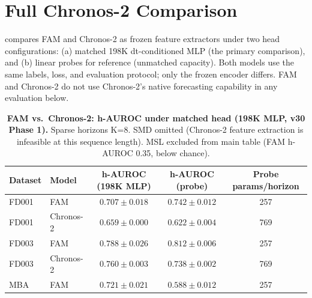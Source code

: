 \documentclass{article}
\begin{document}
\section{Full Chronos-2 Comparison}
\label{app:chronos_full}

 compares FAM and Chronos-2 as frozen feature extractors under two head configurations: (a) matched 198K dt-conditioned MLP (the primary comparison), and (b) linear probes for reference (unmatched capacity). Both models use the same labels, loss, and evaluation protocol; only the frozen encoder differs. FAM and Chronos-2 do not use Chronos-2's native forecasting capability in any evaluation below.

\begin{table}[h]
  \centering
  \caption{\textbf{FAM vs.\ Chronos-2: h-AUROC under matched head (198K MLP, v30 Phase 1).} Sparse horizons K=8. SMD omitted (Chronos-2 feature extraction is infeasible at this sequence length). MSL excluded from main table (FAM h-AUROC 0.35, below chance).}
  \label{tab:chronos_full}
  \small
  \begin{tabular}{llccc}
    \toprule
    Dataset                                          & Model                                                                        & h-AUROC (198K MLP)         & h-AUROC (probe)            & Probe params/horizon \\
    \midrule
    FD001                                            & FAM                                                                          & $\mathbf{0.707 \pm 0.018}$ & $\mathbf{0.742 \pm 0.012}$ & 257                  \\
    FD001                                            & Chronos-2                                                                    & $0.659 \pm 0.000$          & $0.622 \pm 0.004$          & 769                  \\
    \midrule
    FD003                                            & FAM                                                                          & $\mathbf{0.788 \pm 0.026}$ & $\mathbf{0.812 \pm 0.006}$ & 257                  \\
    FD003                                            & Chronos-2                                                                    & $0.760 \pm 0.003$          & $0.738 \pm 0.002$          & 769                  \\
    \midrule
    MBA                                              & FAM                                                                          & $\mathbf{0.721 \pm 0.021}$ & $0.588 \pm 0.012$          & 257                  \\

\end{tabular}
\end{table}
\end{document}
